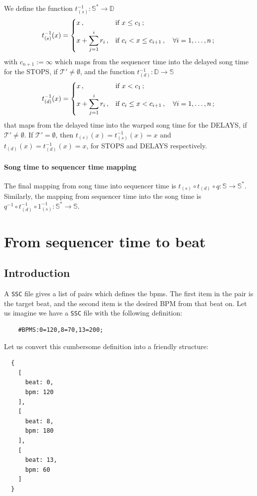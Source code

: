 \documentclass[a4paper,9pt]{article}
\begin{document}
We define the function $ t_{(s)}^{-1}: \mathbb{S^{*}}\rightarrow \mathbb{D} $
\begin{equation}
	t_{(s)}^{-1}(x) = \begin{dcases}
		x\,, & \text{if $ x \leq c_1 $}\,;\\
		x+ \sum_{j=1}^{i}r_i\,, & \text{if $ c_i < x \leq c_{i+1}\,,\quad \forall i=1,\dots,n$}\,;\\
	\end{dcases}
	\label{eq:t-1s}
\end{equation}
with $ c_{n+1} := \infty $ which maps from the sequencer time into the delayed song time for the STOPS, if $ \mathcal{T'} \neq \emptyset $, and the function $ t_{(d)}^{-1}: \mathbb{D}\rightarrow \mathbb{S} $
\begin{equation}
	t_{(d)}^{-1}(x) = \begin{dcases}
		x\,, & \text{if $ x < c_1 $}\,;\\
		x+ \sum_{j=1}^{i}r_i\,, & \text{if $ c_i \leq x < c_{i+1}\,,\quad \forall i=1,\dots,n$}\,;\\
	\end{dcases}
	\label{eq:t-1s}
\end{equation}
that maps from the delayed time into the warped song time for the DELAYS, if $ \mathcal{T'}\neq \emptyset $. If $ \mathcal{T'} = \emptyset $, then $ t_{(s)}(x) = t_{(s)}^{-1}(x) = x$ and $t_{(d)}(x) = t_{(d)}^{-1} (x) = x $, for STOPS and DELAYS respectively.
\paragraph{Song time to sequencer time mapping}
The final mapping from song time into sequencer time is  $ t_{(s)}\circ t_{(d)}\circ q: \mathbb{S}\rightarrow \mathbb{S^{*}} $. Similarly, the mapping from sequencer time into the song time is $ q^{-1}\circ t_{(d)}^{-1}\circ 1_{(s)}^{-1}: \mathbb{S^{*}}\rightarrow \mathbb{S} $.
    \section{From sequencer time to beat}

    \subsection{Introduction}\label{sec:stepmania-definition-time2beat}
    
    A \texttt{SSC} file gives a list of pairs which defines the bpms. The first item in the pair is the target beat, and the second item is the desired BPM from that beat on. Let us imagine we have a \texttt{SSC} file with the following definition:
    \begin{verbatim}
    #BPMS:0=120,8=70,13=200;     
    \end{verbatim}
    Let us convert this cumbersome definition into a friendly structure:
    \begin{verbatim}
  {
    [
      beat: 0,
      bpm: 120
    ],
    [
      beat: 8,
      bpm: 180 
    ],
    [
      beat: 13,
      bpm: 60 
    ]
  }
    \end{verbatim}
\end{document}
